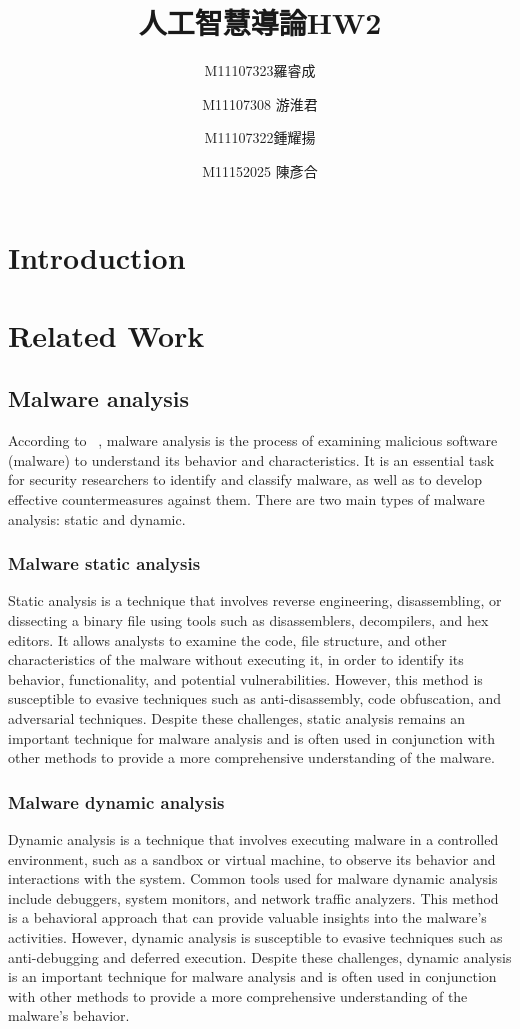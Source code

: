 \documentclass{article}
\title{人工智慧導論HW2}
\author{M11107323羅睿成 \and M11107308 游淮君 \and M11107322鍾耀揚 \and M11152025 陳彥合}
\begin{document}
\maketitle
\section{Introduction}

\section{Related Work}
\subsection{Malware analysis}
According to ~\cite{ref1}, malware analysis is the process of examining malicious software (malware) to understand its behavior and characteristics. It is an essential task for security researchers to identify and classify malware, as well as to develop effective countermeasures against them. There are two main types of malware analysis: static and dynamic.
\subsubsection{Malware static analysis}
Static analysis is a technique that involves reverse engineering, disassembling, or dissecting a binary file using tools such as disassemblers, decompilers, and hex editors. It allows analysts to examine the code, file structure, and other characteristics of the malware without executing it, in order to identify its behavior, functionality, and potential vulnerabilities. However, this method is susceptible to evasive techniques such as anti-disassembly, code obfuscation, and adversarial techniques. Despite these challenges, static analysis remains an important technique for malware analysis and is often used in conjunction with other methods to provide a more comprehensive understanding of the malware.
\subsubsection{Malware dynamic analysis}
Dynamic analysis is a technique that involves executing malware in a controlled environment, such as a sandbox or virtual machine, to observe its behavior and interactions with the system. Common tools used for malware dynamic analysis include debuggers, system monitors, and network traffic analyzers. This method is a behavioral approach that can provide valuable insights into the malware's activities. However, dynamic analysis is susceptible to evasive techniques such as anti-debugging and deferred execution. Despite these challenges, dynamic analysis is an important technique for malware analysis and is often used in conjunction with other methods to provide a more comprehensive understanding of the malware's behavior.
\end{document}
